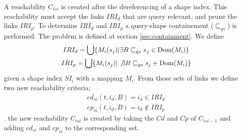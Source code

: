 A reachability $C_{tsi}$ is created after the dereferencing of a shape index.
This reachability must accept the links $IRI_d$ that are query relevant, and prune the links $IRI_p$.
To determine $IRI_d$ and $IRI_p$ a query-shape containement ($\sqsubseteq_{qs}$) is performed.
The problem is defined at section \ref{sec:containment}.
We define
\begin{gather}
   IRI_d = \bigcup \{ M_i(s_j) | \exists B \sqsubseteq_{qs}  s_j \in \text{Dom}(M_i) \} \\
   IRI_p = \bigcup \{ M_i(s_j) | \not\exists B \sqsubseteq_{qs}  s_j \in \text{Dom}(M_i) \}
\end{gather}
given a shape index $SI_i$ with a mapping $M_i$.
From those sets of links we define two new reachability criteria;
\begin{gather}
   cd_{si}(t, i_d, B) = i_d \in IRI_d \\
   cp_{si}(t, i_d, B) = i_d \not\in IRI_p
\end{gather}
.
the new reachability $C_{tsi}$ is created by taking the $Cd$ and $Cp$ of $C_{tsi - 1}$ and adding
$cd_{si}$ and $cp_{si}$ to the corresponding set. 

\iffalse
\begin{algorithm}
   \caption{Dynamic reachability generation algorithm with a shape index}\label{alg:shapeIndex}
   \begin{algorithmic}
      \REQUIRE Given a Shape Index $(M, D)$ and a query $Q$
      \ENSURE $IRI_d$ a set of IRI leading to query relevant sources and $IRI_p$ a set of IRI leading to non query relevant sources

      \STATE Divide the $Q$ into a set of star pattern with dependencies $Q_{sd}$ such that $Q = q_{sd,1}  \bowtie q_{sd,2} ... \bowtie q_{sd,n}$ given $n$  $q_{sd,i}$.
      \STATE $IRI_d = \{\}$
      \STATE $ContainedQueries = \{\}$
      \STATE $IRI_p = \{\}$

      \FORALL{$q_{sd} \in Q_{sd}$}
         \FORALL{$(s, iri) \in M$}
            \IF{$q_{sd} \sqsubseteq_l T(s)$}
               \STATE $IRI_d = IRI_d \cup \{iri\}$
               \STATE $ContainedQueries = ContainedQueries \cup \{q_{sd}\}$   
            \ENDIF
         \ENDFOR
      \ENDFOR
      
      

      \IF{$(IRI_0 \in D) = \emptyset$ \OR $Q_{sd} \setminus containedQueries = \emptyset$}
         \STATE $IRI_p = D \setminus IRI_d$
      \ELSE
         \STATE $IRI_m = \{\text{Codomain of }m_i(s)| \forall m_i \in M \}$
         \STATE $IRI_p = IRI_m \setminus IRI_d$
      \ENDIF
   \end{algorithmic}
\end{algorithm}
\fi


